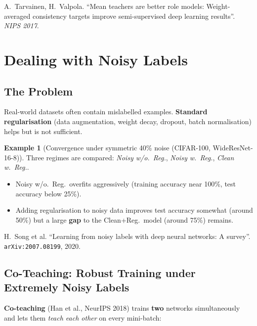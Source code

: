 \documentclass[11pt,a4paper]{article}
\theoremstyle{definition}
\newtheorem{example}{Example}[section]
\theoremstyle{plain}
\theoremstyle{remark}
\begin{document}
\begin{tcolorbox}[colback=blue!5!white,colframe=blue!60!black,title={Reference}]
A.\ Tarvainen, H.\ Valpola. ``Mean teachers are better role models: Weight-averaged consistency targets improve semi-supervised deep learning results''. \textit{NIPS 2017}.
\end{tcolorbox}


\section{Dealing with Noisy Labels}

\subsection{The Problem}

Real-world datasets often contain mislabelled examples. \textbf{Standard regularisation} (data augmentation, weight decay, dropout, batch normalisation) helps but is not sufficient.

\begin{example}[Convergence under symmetric 40\% noise (CIFAR-100, WideResNet-16-8)]
Three regimes are compared: \emph{Noisy w/o.\ Reg.}, \emph{Noisy w.\ Reg.}, \emph{Clean w.\ Reg.}.
\begin{itemize}[leftmargin=*]
    \item Noisy w/o.\ Reg.\ overfits aggressively (training accuracy near 100\%, test accuracy below 25\%).
    \item Adding regularisation to noisy data improves test accuracy somewhat (around 50\%) but a large \textbf{gap} to the Clean+Reg.\ model (around 75\%) remains.
\end{itemize}
\end{example}

\begin{tcolorbox}[colback=blue!5!white,colframe=blue!60!black,title={Reference}]
H.\ Song et al. ``Learning from noisy labels with deep neural networks: A survey''. \texttt{arXiv:2007.08199}, 2020.
\end{tcolorbox}

\subsection{Co-Teaching: Robust Training under Extremely Noisy Labels}

\textbf{Co-teaching} (Han et al., NeurIPS 2018) trains \textbf{two} networks simultaneously and lets them \emph{teach each other} on every mini-batch:
\end{document}

